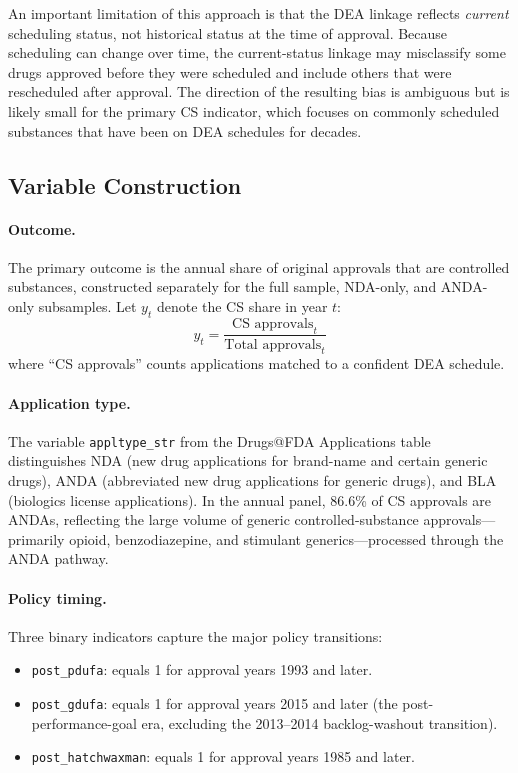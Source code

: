 An important limitation of this approach is that the DEA linkage reflects \textit{current} scheduling status, not historical status at the time of approval. Because scheduling can change over time, the current-status linkage may misclassify some drugs approved before they were scheduled and include others that were rescheduled after approval. The direction of the resulting bias is ambiguous but is likely small for the primary CS indicator, which focuses on commonly scheduled substances that have been on DEA schedules for decades.

\subsection{Variable Construction}

\paragraph{Outcome.}
The primary outcome is the annual share of original approvals that are controlled substances, constructed separately for the full sample, NDA-only, and ANDA-only subsamples. Let $y_t$ denote the CS share in year $t$:
\[
y_t = \frac{\text{CS approvals}_t}{\text{Total approvals}_t}
\]
where ``CS approvals'' counts applications matched to a confident DEA schedule.

\paragraph{Application type.}
The variable \texttt{appltype\_str} from the Drugs@FDA Applications table distinguishes NDA (new drug applications for brand-name and certain generic drugs), ANDA (abbreviated new drug applications for generic drugs), and BLA (biologics license applications). In the annual panel, 86.6\% of CS approvals are ANDAs, reflecting the large volume of generic controlled-substance approvals---primarily opioid, benzodiazepine, and stimulant generics---processed through the ANDA pathway.

\paragraph{Policy timing.}
Three binary indicators capture the major policy transitions:
\begin{itemize}[noitemsep]
  \item \texttt{post\_pdufa}: equals 1 for approval years 1993 and later.
  \item \texttt{post\_gdufa}: equals 1 for approval years 2015 and later (the post-performance-goal era, excluding the 2013--2014 backlog-washout transition).
  \item \texttt{post\_hatchwaxman}: equals 1 for approval years 1985 and later.
\end{itemize}

